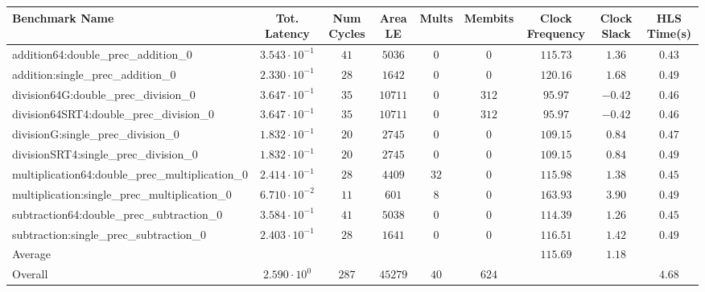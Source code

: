 \begin{tabular}{|l|c|c|c|c|c|c|c|c|}
\hline
Benchmark Name                                   & Tot. Latency            & Num Cycles & Area LE   & Mults  & Membits & Clock Frequency & Clock Slack & HLS Time(s) \\
\hline
addition64:double\_prec\_addition\_0             & $ 3.543 \cdot 10^{-1} $ & $ 41     $ & $ 5036  $ & $ 0  $ & $ 0   $ & $ 115.73      $ & $ 1.36    $ & $ 0.43    $ \\
addition:single\_prec\_addition\_0               & $ 2.330 \cdot 10^{-1} $ & $ 28     $ & $ 1642  $ & $ 0  $ & $ 0   $ & $ 120.16      $ & $ 1.68    $ & $ 0.49    $ \\
division64G:double\_prec\_division\_0            & $ 3.647 \cdot 10^{-1} $ & $ 35     $ & $ 10711 $ & $ 0  $ & $ 312 $ & $ 95.97       $ & $ -0.42   $ & $ 0.46    $ \\
division64SRT4:double\_prec\_division\_0         & $ 3.647 \cdot 10^{-1} $ & $ 35     $ & $ 10711 $ & $ 0  $ & $ 312 $ & $ 95.97       $ & $ -0.42   $ & $ 0.46    $ \\
divisionG:single\_prec\_division\_0              & $ 1.832 \cdot 10^{-1} $ & $ 20     $ & $ 2745  $ & $ 0  $ & $ 0   $ & $ 109.15      $ & $ 0.84    $ & $ 0.47    $ \\
divisionSRT4:single\_prec\_division\_0           & $ 1.832 \cdot 10^{-1} $ & $ 20     $ & $ 2745  $ & $ 0  $ & $ 0   $ & $ 109.15      $ & $ 0.84    $ & $ 0.49    $ \\
multiplication64:double\_prec\_multiplication\_0 & $ 2.414 \cdot 10^{-1} $ & $ 28     $ & $ 4409  $ & $ 32 $ & $ 0   $ & $ 115.98      $ & $ 1.38    $ & $ 0.45    $ \\
multiplication:single\_prec\_multiplication\_0   & $ 6.710 \cdot 10^{-2} $ & $ 11     $ & $ 601   $ & $ 8  $ & $ 0   $ & $ 163.93      $ & $ 3.90    $ & $ 0.49    $ \\
subtraction64:double\_prec\_subtraction\_0       & $ 3.584 \cdot 10^{-1} $ & $ 41     $ & $ 5038  $ & $ 0  $ & $ 0   $ & $ 114.39      $ & $ 1.26    $ & $ 0.45    $ \\
subtraction:single\_prec\_subtraction\_0         & $ 2.403 \cdot 10^{-1} $ & $ 28     $ & $ 1641  $ & $ 0  $ & $ 0   $ & $ 116.51      $ & $ 1.42    $ & $ 0.49    $ \\
\hline
Average                                          & $                     $ & $        $ & $       $ & $    $ & $     $ & $ 115.69      $ & $ 1.18    $ & $         $ \\
\hline
Overall                                          & $ 2.590 \cdot 10^{0}  $ & $ 287    $ & $ 45279 $ & $ 40 $ & $ 624 $ & $             $ & $         $ & $ 4.68    $ \\
\hline
\end{tabular}

